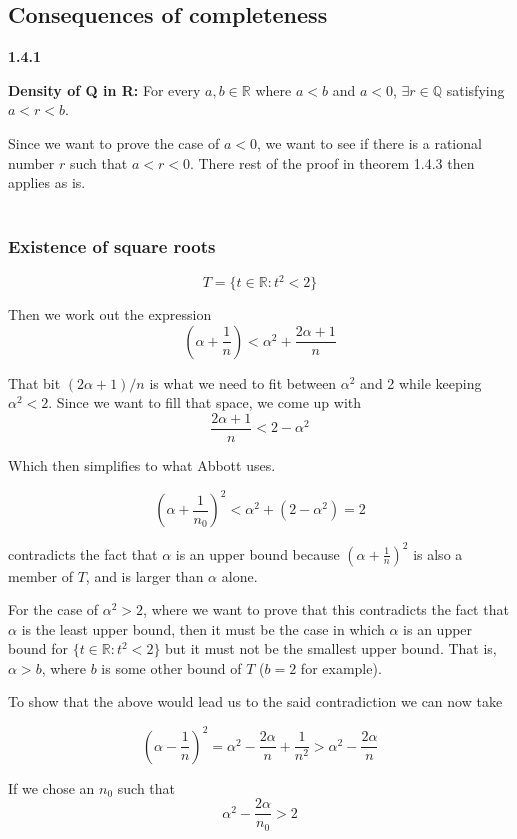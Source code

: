 \subsection{Consequences of completeness}


\textbf{1.4.1}

\textbf{Density of Q in R:} For every $a,b \in \mathbb{R}$ where $a < b$ and $a<0$, $\exists r \in \mathbb{Q}$
satisfying $a < r < b$.

Since we want to prove the case of $a<0$, we want to see if there is a rational number $r$ such that $a < r < 0$.
There rest of the proof in theorem 1.4.3 then applies as is.
\\~\\


\subsubsection{Existence of square roots}

$$
T = \{ t\in\mathbb{R} : t^2 < 2 \}
$$

Then we work out the expression
$$
\left( \alpha + \frac{1}{n} \right) < \alpha^2 + \frac{2\alpha + 1}{n}
$$

That bit $(2\alpha + 1)/n$ is what we need to fit between $\alpha^2$ and 2 while keeping $\alpha^2 <2$.
Since we want to fill that space, we come up with
$$
\frac{2\alpha + 1}{n} < 2 - \alpha^2
$$

Which then simplifies to what Abbott uses.


$$
\left( \alpha + \frac{1}{n_0} \right)^2 < \alpha^2 + (2 - \alpha^2) = 2
$$

contradicts the fact that $\alpha$ is an upper bound because $(\alpha + \frac{1}{n})^2$ is also a member of
$T$, and is larger than $\alpha$ alone.

For the case of $\alpha^2 > 2$, where we want to prove that this contradicts the fact that $\alpha$ is the least upper bound,
then it must be the case in which $\alpha$ is an upper bound for $\{ t \in \mathbb{R} : t^2 < 2 \}$ but it must not be
the smallest upper bound.
That is, $\alpha > b$, where $b$ is some other bound of $T$ ($b=2$ for example).

To show that the above would lead us to the said contradiction we can now take

$$
\left( \alpha - \frac{1}{n} \right)^2 =
    \alpha^2 - \frac{2\alpha}{n} + \frac{1}{n^2} >
    \alpha^2 - \frac{2\alpha}{n}
$$

If we chose an $n_0$ such that 
$$
\alpha^2 - \frac{2\alpha}{n_0} > 2
$$

